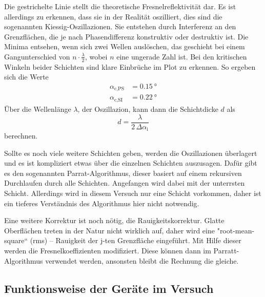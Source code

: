 Die gestrichelte Linie stellt die theoretische Fresnelreflektivität dar.
Es ist allerdings zu erkennen, dass sie in der Realität oszilliert, dies sind die sogenannten Kiessig-Oszillazionen. 
Sie entstehen durch Interferenz an den Grenzflächen, die je nach Phasendifferenz konstruktiv oder destruktiv ist.
Die Minima entsehen, wenn sich zwei Wellen auslöschen, das geschieht bei einem Gangunterschied von $ n \cdot \frac{\lambda}{2}$, wobei $n$ eine ungerade Zahl ist.
Bei den kritischen Winkeln beider Schichten sind klare Einbrüche im Plot zu erkennen. 
So ergeben sich die Werte
\begin{align}
    \alpha _\text{c,PS} &= \SI{0.15}{\degree} \\
    \alpha _\text{c,SI} &= \SI{0.22}{\degree}
\end{align}
Über die Wellenlänge $\lambda$, der Oszillazion, kann dann die Schichtdicke $d$ als 
\begin{equation}
    d = \frac{\lambda}{2 \, \Delta \alpha _\text{i}}
    \label{eq:schicht}
\end{equation}
berechnen.

Sollte es noch viele weitere Schichten geben, werden die Oszillazionen überlagert und es ist kompliziert etwas über die einzelnen Schichten auszusagen.
Dafür gibt es den sogenannten Parrat-Algorithmus, dieser basiert auf einem rekursiven Durchlaufen durch alle Schichten.
Angefangen wird dabei mit der unterrsten Schicht.
Allerdings wird in diesem Versuch nur eine Schicht vorkommen, daher ist ein tieferes Verständnis des Algorithmus hier nicht notwendig.

Eine weitere Korrektur ist noch nötig, die Rauigkeitskorrektur. 
Glatte Oberflächen treten in der Natur nicht wirklich auf, daher wird eine "root-mean-square“ (rms) – Rauigkeit der j-ten Grenzfläche eingeführt.
Mit Hilfe dieser werden die Fresnelkoeffizienten modifiziert.
Diese können dann im Parratt-Algorithmus verwendet werden, ansonsten bleibt die Rechnung die gleiche.

\subsection{Funktionsweise der Geräte im Versuch}
\label{theo3}
 
